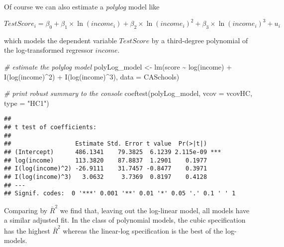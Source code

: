\documentclass[
]{article}
\newenvironment{Shaded}{\begin{snugshade}}{\end{snugshade}}
\newcommand{\AttributeTok}[1]{\textcolor[rgb]{0.77,0.63,0.00}{#1}}
\newcommand{\CommentTok}[1]{\textcolor[rgb]{0.56,0.35,0.01}{\textit{#1}}}
\newcommand{\DecValTok}[1]{\textcolor[rgb]{0.00,0.00,0.81}{#1}}
\newcommand{\FunctionTok}[1]{\textcolor[rgb]{0.00,0.00,0.00}{#1}}
\newcommand{\NormalTok}[1]{#1}
\newcommand{\OtherTok}[1]{\textcolor[rgb]{0.56,0.35,0.01}{#1}}
\newcommand{\SpecialCharTok}[1]{\textcolor[rgb]{0.00,0.00,0.00}{#1}}
\newcommand{\StringTok}[1]{\textcolor[rgb]{0.31,0.60,0.02}{#1}}
\begin{document}
Of course we can also estimate a \emph{polylog} model like

\[ TestScore_i = \beta_0 + \beta_1 \times \ln(income_i) + \beta_2 \times \ln(income_i)^2 + \beta_3 \times \ln(income_i)^3 + u_i \]

which models the dependent variable \(TestScore\) by a third-degree
polynomial of the log-transformed regressor \(income\).

\begin{Shaded}
\begin{Highlighting}[]
\CommentTok{\# estimate the polylog model}
\NormalTok{polyLog\_model }\OtherTok{\textless{}{-}} \FunctionTok{lm}\NormalTok{(score }\SpecialCharTok{\textasciitilde{}} \FunctionTok{log}\NormalTok{(income) }\SpecialCharTok{+} \FunctionTok{I}\NormalTok{(}\FunctionTok{log}\NormalTok{(income)}\SpecialCharTok{\^{}}\DecValTok{2}\NormalTok{) }\SpecialCharTok{+} \FunctionTok{I}\NormalTok{(}\FunctionTok{log}\NormalTok{(income)}\SpecialCharTok{\^{}}\DecValTok{3}\NormalTok{), }
                    \AttributeTok{data =}\NormalTok{ CASchools)}

\CommentTok{\# print robust summary to the console}
\FunctionTok{coeftest}\NormalTok{(polyLog\_model, }
         \AttributeTok{vcov =}\NormalTok{ vcovHC, }\AttributeTok{type =} \StringTok{"HC1"}\NormalTok{)}
\end{Highlighting}
\end{Shaded}

\begin{verbatim}
## 
## t test of coefficients:
## 
##                  Estimate Std. Error t value  Pr(>|t|)    
## (Intercept)      486.1341    79.3825  6.1239 2.115e-09 ***
## log(income)      113.3820    87.8837  1.2901    0.1977    
## I(log(income)^2) -26.9111    31.7457 -0.8477    0.3971    
## I(log(income)^3)   3.0632     3.7369  0.8197    0.4128    
## ---
## Signif. codes:  0 '***' 0.001 '**' 0.01 '*' 0.05 '.' 0.1 ' ' 1
\end{verbatim}

Comparing by \(\bar{R}^2\) we find that, leaving out the log-linear
model, all models have a similar adjusted fit. In the class of
polynomial models, the cubic specification has the highest \(\bar{R}^2\)
whereas the linear-log specification is the best of the log-models.
\end{document}
